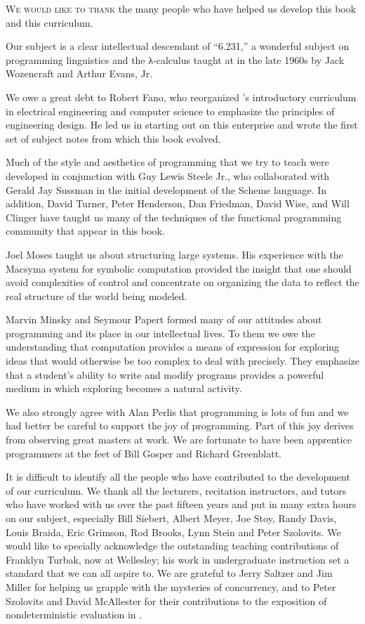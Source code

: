 \label{Acknowledgments}

\lettrine[findent=1pt]{W}{e would like to thank} the many people who have helped us develop this book and this curriculum.

Our subject is a clear intellectual descendant of “6.231,” a wonderful subject on programming linguistics and the λ-calculus taught at  in the late 1960s by Jack Wozencraft and Arthur Evans, Jr.

We owe a great debt to Robert Fano, who reorganized ’s introductory curriculum in electrical engineering and computer science to emphasize the principles of engineering design. 
He led us in starting out on this enterprise and wrote the first set of subject notes from which this book evolved.

Much of the style and aesthetics of programming that we try to teach were developed in conjunction with Guy Lewis Steele Jr., who collaborated with Gerald Jay Sussman in the initial development of the Scheme language.
In addition, David Turner, Peter Henderson, Dan Friedman, David Wise, and Will Clinger have taught us many of the techniques of the functional programming community that appear in this book.

Joel Moses taught us about structuring large systems.
His experience with the Macsyma system for symbolic computation provided the insight that one should avoid complexities of control and concentrate on organizing the data to reflect the real structure of the world being modeled.

Marvin Minsky and Seymour Papert formed many of our attitudes about programming and its place in our intellectual lives.
To them we owe the understanding that computation provides a means of expression for exploring ideas that would otherwise be too complex to deal with precisely.
They emphasize that a student’s ability to write and modify programs provides a powerful medium in which exploring becomes a natural activity.

We also strongly agree with Alan Perlis that programming is lots of fun and we had better be careful to support the joy of programming.
Part of this joy derives from observing great masters at work.
We are fortunate to have been apprentice programmers at the feet of Bill Gosper and Richard Greenblatt.

It is difficult to identify all the people who have contributed to the development of our curriculum.
We thank all the lecturers, recitation instructors, and tutors who have worked with us over the past fifteen years and put in many extra hours on our subject, especially Bill Siebert, Albert Meyer, Joe Stoy, Randy Davis, Louis Braida, Eric Grimson, Rod Brooks, Lynn Stein and Peter Szolovits.
We would like to specially acknowledge the outstanding teaching contributions of Franklyn Turbak, now at Wellesley;
his work in undergraduate instruction set a standard that we can all aspire to.
We are grateful to Jerry Saltzer and Jim Miller for helping us grapple with the mysteries of concurrency, and to Peter Szolovits and David McAllester for their contributions to the exposition of nondeterministic evaluation in .

